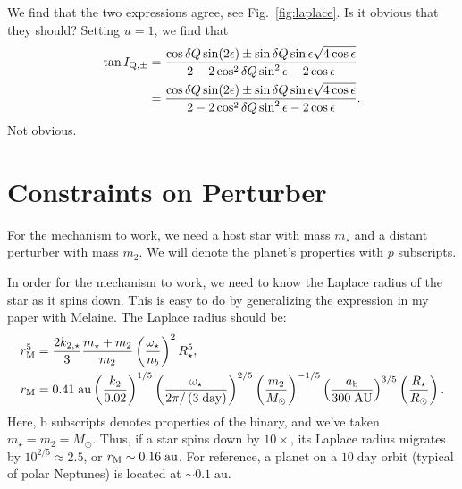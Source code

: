 \documentclass[11pt,
        usenames, %
        dvipsnames %
    ]{article}
\newcommand*{\p}[1]{\left(#1\right)}
\begin{document}
We find that the two expressions agree, see Fig.~\ref{fig:laplace}. Is it
obvious that they should? Setting $u = 1$, we find that
\begin{align}
    \tan I_{\rm Q, \pm} &=
        \frac{\cos \delta Q \sin (2\epsilon) \pm \sin \delta Q
            \sin \epsilon\sqrt{4\cos \epsilon}}{
            2 - 2\cos^2 \delta Q \sin^2\epsilon - 2\cos \epsilon}\nonumber\\
        &=
        \frac{\cos \delta Q \sin (2\epsilon) \pm \sin \delta Q
            \sin \epsilon\sqrt{4\cos \epsilon}}{
            2 - 2\cos^2 \delta Q \sin^2\epsilon - 2\cos \epsilon}.
\end{align}
Not obvious.

\clearpage

\section{Constraints on Perturber}

For the mechanism to work, we need a host star with mass $m_\star$ and a
distant perturber with mass $m_2$.
We will denote the planet's properties with $p$ subscripts.

In order for the mechanism to work, we need to know the Laplace radius of the
star as it spins down.
This is easy to do by generalizing the expression in my paper with Melaine.
The Laplace radius should be:
\begin{align}
    r_{\rm M}^5
        &=
            \frac{2k_{2,\star}}{3}
                \frac{m_\star + m_2}{m_2}
                \p{\frac{\omega_\star}{n_b}}^2
                R_\star^5,\\
    r_{\rm M}
        &= 0.41\;\mathrm{au}
            \p{\frac{k_2}{0.02}}^{1/5}
            \p{\frac{\omega_\star}{2\pi / \p{3\;\mathrm{day}}}}^{2/5}
            \p{\frac{m_2}{M_{\odot}}}^{-1/5}
            \p{\frac{a_{\rm b}}{300\;\mathrm{AU}}}^{3/5}
            \p{\frac{R_\star}{R_{\odot}}}.
\end{align}
Here, b subscripts denotes properties of the binary, and we've taken $m_\star =
m_2 = M_{\odot}$.
Thus, if a star spins down by $10\times$, its Laplace radius migrates by
$10^{2/5} \approx 2.5$, or $r_{\rm M} \sim 0.16\;\mathrm{au}$.
For reference, a planet on a $10\;\mathrm{day}$ orbit (typical of polar
Neptunes) is located at $\sim 0.1\;\mathrm{au}$.
\end{document}
